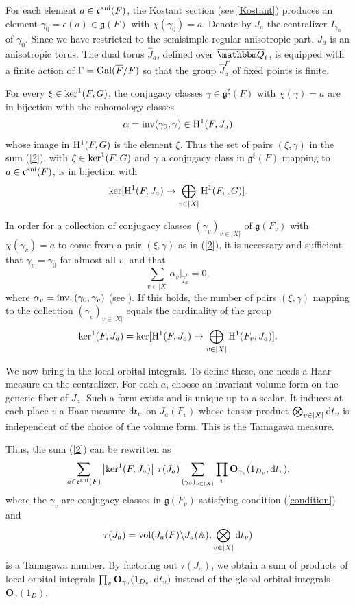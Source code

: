 \documentclass[12pt,english]{smfart}
\numberwithin{equation}{subsection}
\theoremstyle{remark}
\newcommand\frakc{{\mathfrak c}}
\newcommand\bfO{{\mathbf O}}
\newcommand\QQ{{\mathbbm Q}}
\newcommand\bbA{{\mathbb A}}
\newcommand\ani{{\rm ani}}
\newcommand\Ql{{\overline\QQ_\ell}}
\begin{document}
For each element $a\in\frakc^\ani(F)$, the Kostant section (see \ref{Kostant}) produces an element $\gamma_0=\epsilon(a)\in {\mathfrak g}(F)$ with $\chi(\gamma_0)=a$. Denote by $J_a$ the centralizer $I_{\gamma_0}$ of $\gamma_0$. Since we have restricted to the semisimple regular anisotropic part, $J_a$ is an anisotropic torus. The dual torus $\hat J_a$, defined over $\Ql$, is equipped with a finite action of $\Gamma={\rm Gal}(\overline F/F)$ so that the group $\hat J_a^\Gamma$ of fixed points is finite.

For every $\xi\in {\rm ker}^1(F,G)$, the conjugacy classes $\gamma\in {\mathfrak g}^\xi(F)$ with $\chi(\gamma)=a$ are in bijection with the cohomology classes
$$\alpha={\rm inv}(\gamma_0,\gamma)\in {\rm H}^1(F,J_a)$$
whose image in ${\rm H}^1(F,G)$ is the element $\xi$. Thus the set of pairs $(\xi,\gamma)$ in the sum (\ref{2}), with $\xi\in {\rm ker}^1(F,G)$ and $\gamma$ a conjugacy class in ${\mathfrak g}^\xi(F)$ mapping to $a\in \frakc^{\rm ani}(F)$, is in bijection with
$${\rm ker}[{\rm H}^1(F,J_a)\rightarrow \bigoplus_{v\in |X|}
{\rm H}^1(F_v,G)].$$

In order for a collection of conjugacy classes
$(\gamma_v)_{v\in|X|}$ of ${\mathfrak g}(F_v)$ with $\chi(\gamma_v)=a$ to come from a pair $(\xi,\gamma)$ as in (\ref{2}), it is necessary and sufficient that $\gamma_v=\gamma_0$ for almost all $v$, and that
\begin{equation}\label{condition}
\sum_{v\in |X|}\alpha_v\big|_{\hat I_a^\Gamma}=0,
\end{equation}
where $\alpha_v={\rm inv}_v(\gamma_0,\gamma_v)$ (see \cite{K-CTT}). If this holds, the number of pairs $(\xi,\gamma)$ mapping to the collection $(\gamma_v)_{v\in|X|}$ equals the cardinality of the group
$${\rm ker}^1(F,J_a)={\rm ker}[{\rm H}^1(F,J_a)\rightarrow
\bigoplus_{v\in |X|} {\rm H}^1(F_v,J_a)].$$

We now bring in the local orbital integrals. To define these, one needs a Haar measure on the centralizer. For each $a$, choose an invariant volume form on the generic fiber of $J_a$. Such a form exists and is unique up to a scalar. It induces at each place $v$ a Haar measure ${\rm d}t_v$ on $J_a(F_v)$ whose tensor product $\bigotimes_{v\in|X|} {\rm d} t_v$ is independent of the choice of the volume form. This is the Tamagawa measure.

Thus, the sum (\ref{2}) can be rewritten as
\begin{equation}
\sum_{a\in\frakc^\ani(F)}\left|{\rm ker}^1(F,J_a)\right|\,
\tau(J_a) \sum_{(\gamma_v)_{v\in|X|}} \prod_v
\bfO_{\gamma_v}(1_{D_v},{\rm d}t_v),
\end{equation}
where the $\gamma_v$ are conjugacy classes in ${\mathfrak g}(F_v)$ satisfying condition (\ref{condition}) and
$$\tau(J_a)={\rm vol}(J_a(F)\backslash J_a(\bbA), \bigotimes_{v\in|X|} {\rm d}t_v)$$
is a Tamagawa number. By factoring out $\tau(J_a)$, we obtain a sum of products of local orbital integrals $\prod_v \bfO_{\gamma_v}(1_{D_v},{\rm d}t_v)$ instead of the global orbital integrals $\bfO_\gamma(1_D)$.
\end{document}
